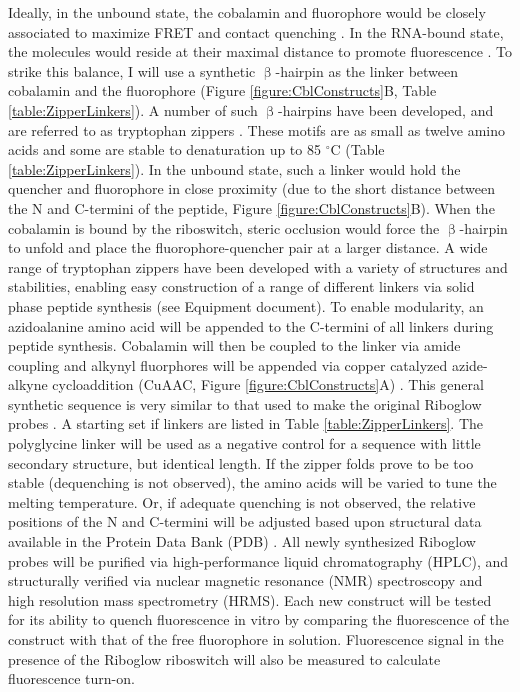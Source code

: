 Ideally, in the unbound state, the cobalamin and fluorophore would be closely associated to maximize FRET and contact quenching \cite{RosendahlSynthesisbiologicalactivity1982a,ShellVitaminB12Tunable2015,ShellTunableVisibleIR2014}.
In the RNA-bound state, the molecules would reside at their maximal distance to promote fluorescence \cite{LeeDesignSynthesisCharacterization2009}.
To strike this balance, I will use a synthetic $\upbeta$-hairpin as the linker between cobalamin and the fluorophore (Figure \ref{figure:CblConstructs}B, Table \ref{table:ZipperLinkers}).
A number of such $\upbeta$-hairpins have been developed, and are referred to as tryptophan zippers \cite{CochranTryptophanzippersStable2001}.
These motifs are as small as twelve amino acids and some are stable to denaturation up to 85 $^\circ$C (Table \ref{table:ZipperLinkers}).
In the unbound state, such a linker would hold the quencher and fluorophore in close proximity (due to the short distance between the N and C-termini of the peptide, Figure \ref{figure:CblConstructs}B).
When the cobalamin is bound by the riboswitch, steric occlusion would force the $\upbeta$-hairpin to unfold and place the fluorophore-quencher pair at a larger distance.
A wide range of tryptophan zippers have been developed with a variety of structures and stabilities, enabling easy construction of a range of different linkers via solid phase peptide synthesis \cite{CochranTryptophanzippersStable2001,KierProbingLowerSize2008,AndersenMinimizationOptimizationDesigned2006,FesinmeyerEnhancedHairpinStability2004} (see Equipment document).
To enable modularity, an azidoalanine amino acid will be appended to the C-termini of all linkers during peptide synthesis.
Cobalamin will then be coupled to the linker via amide coupling and alkynyl fluorphores will be appended via copper catalyzed azide-alkyne cycloaddition (CuAAC, Figure \ref{figure:CblConstructs}A) \cite{KolbHartmuthC.ClickChemistryDiverse2001,PattersonFindingRightBioorthogonal2014}.
This general synthetic sequence is very similar to that used to make the original Riboglow probes \cite{Braselmannmulticolorriboswitchbasedplatform2018}.
A starting set if linkers are listed in Table \ref{table:ZipperLinkers}.
The polyglycine linker will be used as a negative control for a sequence with little secondary structure, but identical length.
If the zipper folds prove to be too stable (dequenching is not observed), the amino acids will be varied to tune the melting temperature.
Or, if adequate quenching is not observed, the relative positions of the N and C-termini will be adjusted based upon structural data available in the Protein Data Bank (PDB) \cite{AndersenMinimizationOptimizationDesigned2006}.
All newly synthesized Riboglow probes will be purified via high-performance liquid chromatography (HPLC), and structurally verified via nuclear magnetic resonance (NMR) spectroscopy and high resolution mass spectrometry (HRMS).
Each new construct will be tested for its ability to quench fluorescence in vitro by comparing the fluorescence of the construct with that of the free fluorophore in solution. Fluorescence signal in the presence of the Riboglow riboswitch will also be measured to calculate fluorescence turn-on.


